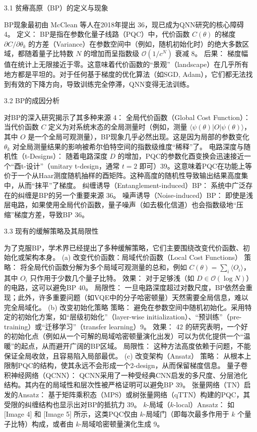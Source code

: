 \documentclass[12pt,a4paper]{article}
\begin{document}
3.1 贫瘠高原（BP）的定义与现象

BP现象最初由 McClean 等人在2018年提出 36，现已成为QNN研究的核心障碍 4。
定义： BP是指在参数化量子线路（PQC）中，代价函数 $C(\theta)$ 的梯度 $\partial C / \partial \theta_k$ 的方差（Variance）在参数空间中（例如，随机初始化时）的绝大多数区域，都随着量子比特数 $N$ 的增加而呈指数级 $\mathcal{O}(1/c^N)$ 衰减 8。
后果： 梯度幅值在统计上无限接近于零。这意味着代价函数的“景观”（landscape）在几乎所有地方都是平坦的。对于任何基于梯度的优化算法（如SGD, Adam），它们都无法找到有效的下降方向，导致训练完全停滞，QNN变得无法训练。

3.2 BP的成因分析

对BP的深入研究揭示了其多种来源 4：
全局代价函数（Global Cost Function）： 当代价函数 $C$ 定义为对系统末态的全局测量时（例如，测量 $\langle \psi(\theta) | O | \psi(\theta) \rangle$，其中 $O$ 是一个全局可观测量），BP现象几乎必然出现。这是因为局部的参数变化 $\theta_k$ 对全局测量结果的影响被希尔伯特空间的指数级维度“稀释”了。
电路深度与随机性（t-Designs）： 随着电路深度 $D$ 的增加，PQC的参数化酉变换会迅速接近一个“酉t-设计”（unitary t-design，通常 $t=2$ 即可）39。这意味着PQC在功能上等价于一个从Haar测度随机抽样的酉矩阵。这种高度的随机性导致输出结果高度集中，从而“抹平”了梯度。
纠缠诱导（Entanglement-induced）BP： 系统中广泛存在的纠缠是BP的另一个重要来源 36。
噪声诱导（Noise-induced）BP： 即使是浅层电路，如果使用全局代价函数，量子噪声（如去极化信道）也会指数级地“压缩”梯度方差，导致BP 36。

3.3 现有的缓解策略及其局限性

为了克服BP，学术界已经提出了多种缓解策略，它们主要围绕改变代价函数、初始化或架构本身。
(a) 改变代价函数：局域代价函数（Local Cost Functions）
策略： 将全局代价函数分解为多个局域可观测量的总和，例如 $C(\theta) = \sum_i \langle O_i \rangle$，其中 $O_i$ 只作用于少数几个量子比特。
效果： 对于足够浅（如 $D \in \mathcal{O}(\log N)$）的电路，这可以避免BP 40。
局限性： 一旦电路深度超过对数尺度，BP依然会重现；此外，许多重要问题（如VQE中的分子哈密顿量）天然需要全局信息，难以完全局域化。
(b) 改变初始化策略
策略： 避免在参数空间中随机初始化。采用特定的初始化方案，如“层级初始化”（layer-wise initialization）、“预训练”（pre-training）或“迁移学习”（transfer learning）9。
效果： 42 的研究表明，一个好的初始化点（例如从一个可解的局域哈密顿量演化出发）可以为优化提供一个“温暖”的起点，从而避开广阔的BP区域。
局限性： 这种方法高度依赖于问题，不能保证全局收敛，且容易陷入局部最优。
(c) 改变架构（Ansatz）
策略： 从根本上限制PQC的结构，使其永远不会形成一个2-design，从而保留梯度信息。
量子卷积神经网络（QCNN）： QCNN采用了一种受经典CNN启发的多尺度、分层池化结构。其内在的局域性和层次性被严格证明可以避免BP 39。
张量网络（TN）启发的Ansatz： 基于矩阵乘积态（MPS）或树张量网络（qTTN）构建的PQC，其受限的纠缠结构也显示出对BP的抵抗力 39。
$k$-局域（$k$-local）Ansatz： 如 [Image 4] 和 [Image 5] 所示，这类PQC仅由 $k$-局域门（即每次最多作用于 $k$ 个量子比特）构成，或者由 $k$-局域哈密顿量演化生成 9。
\end{document}
